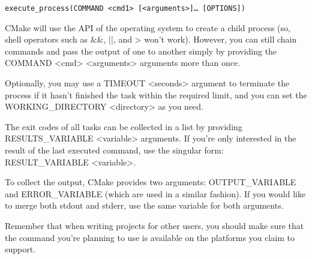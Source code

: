 \begin{lstlisting}[style=styleCMake]
execute_process(COMMAND <cmd1> [<arguments>]… [OPTIONS])
\end{lstlisting}

CMake will use the API of the operating system to create a child process (so, shell operators such as \&\&, ||, and > won't work). However, you can still chain commands and pass the output of one to another simply by providing the COMMAND <cmd> <arguments> arguments more than once.

Optionally, you may use a TIMEOUT <seconds> argument to terminate the process if it hasn't finished the task within the required limit, and you can set the WORKING\_DIRECTORY <directory> as you need.

The exit codes of all tasks can be collected in a list by providing RESULTS\_VARIABLE <variable> arguments. If you're only interested in the result of the last executed command, use the singular form: RESULT\_VARIABLE <variable>.

To collect the output, CMake provides two arguments: OUTPUT\_VARIABLE and ERROR\_VARIABLE (which are used in a similar fashion). If you would like to merge both stdout and stderr, use the same variable for both arguments.

Remember that when writing projects for other users, you should make sure that the command you're planning to use is available on the platforms you claim to support.
















